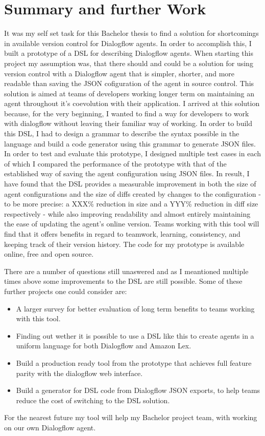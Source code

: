 \chapter{Summary and further Work}

It was my self set task for this Bachelor thesis to find a solution for shortcomings in available version control for Dialogflow agents. In order to accomplish this, I built a prototype of a DSL for describing Dialogflow agents.
When starting this project my assumption was, that there should and could be a solution for using version control with a Dialogflow agent that is simpler, shorter, and more readable than saving the JSON cofiguration of the agent in source control.
This solution is aimed at teams of developers working longer term on maintaining an agent throughout it's coevolution with their application.
I arrived at this solution because, for the very beginning, I wanted to find a way for developers to work with dialogflow without leaving their familiar way of working.
In order to build this DSL, I had to design a grammar to describe the syntax possible in the language and build a code generator using this grammar to generate JSON files.
In order to test and evaluate this prototype, I designed multiple test cases in each of which I compared the performance of the prototype with that of the established way of saving the agent configuration using JSON files.
In result, I have found that the DSL provides a measurable improvement in both the size of agent configurations and the size of diffs created by changes to the configuration - to be more precise: a XXX\% reduction in size and a YYY\% reduction in diff size respectively - while also improving readability and almost entirely maintaining the ease of updating the agent's online version.
Teams working with this tool will find that it offers benefits in regard to teamwork, learning, consistency, and keeping track of their version history.
The code for my prototype is available online, free and open source.

There are a number of questions still unaswered and as I meantioned multiple times above some improvements to the DSL are still possible.
Some of these further projects one could consider are:
\begin{itemize}
    \item A larger survey for better evaluation of long term benefits to teams working with this tool.
    \item Finding out wether it is possible to use a DSL like this to create agents in a uniform language for both Dialogflow and Amazon Lex.
    \item Build a production ready tool from the prototype that achieves full feature parity with the dialogflow web interface.
    \item Build a generator for DSL code from Dialogflow JSON exports, to help teams reduce the cost of switching to the DSL solution.
\end{itemize}

For the nearest future my tool will help my Bachelor project team, with working on our own Dialogflow agent.
